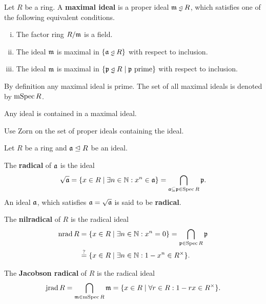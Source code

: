 	\begin{definition}

	\end{definition}

	\begin{definition}
		Let $R$ be a ring. A \textbf{maximal ideal} is a proper ideal $\ideal{m} \divneq R$, which satisfies one of the following equivalent conditions.
		\begin{enumerate}[(i)]
			\item{
				The factor ring $R/\mathfrak{m}$ is a field.
			}
			\item{
				The ideal $\mathfrak{m}$ is maximal in $\{\ideal{a} \divneq R\}$ with respect to inclusion.
			}
			\item{
				The ideal $\mathfrak{m}$ is maximal in $\{\ideal{p} \divneq R \mid \ideal{p} \text{ prime}\}$ with respect to inclusion.
			}
		\end{enumerate}
		By definition any maximal ideal is prime. The set of all maximal ideals is denoted by $\operatorname{mSpec} R$.
	\end{definition}

	\begin{lemma}
		Any ideal is contained in a maximal ideal.
	\end{lemma}
	\begin{sketch}
		Use Zorn on the set of proper ideals containing the ideal.
	\end{sketch}

	\begin{definition}
		Let $R$ be a ring and $\mathfrak{a} \trianglelefteq R$ be an ideal. 

		The \textbf{radical} of $\mathfrak{a}$ is the ideal 
		\begin{equation*}
			\sqrt{\mathfrak{a}} = \{x \in R \mid \exists n \in \mathbb{N}: x^n \in \mathfrak{a}\} = \bigcap \limits_{\mathfrak{a} \subseteq \mathfrak{p} \in \operatorname{Spec} R} \mathfrak{p}.
		\end{equation*}
		An ideal $\mathfrak{a}$, which satisfies $\mathfrak{a} = \sqrt{\mathfrak{a}}$ is said to be \textbf{radical}.

		The \textbf{nilradical} of $R$ is the radical ideal
		\begin{align*}
			\operatorname{nrad} R &= \{x \in R \mid \exists n \in \mathbb{N}: x^n = 0\} = \bigcap \limits_{\mathfrak{p} \in \operatorname{Spec} R} \mathfrak{p}\\
			& \overset{?}{=} \{x \in R \mid \exists n \in \mathbb{N}: 1 - x^n \in R^\times\}.
		\end{align*}

		The \textbf{Jacobson radical} of $R$ is the radical ideal
		\begin{equation*}
			\operatorname{jrad} R = \bigcap \limits_{\mathfrak{m} \in \operatorname{mSpec} R} \mathfrak{m} = \{x \in R \mid \forall r \in R: 1 - rx \in R^\times\}.
		\end{equation*}
	\end{definition}

